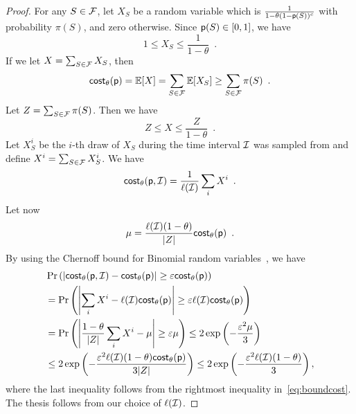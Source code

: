 \begin{proof}
	For any $S\in\mathcal{F}$, let $X_S$ be a random variable which is
	$\frac{1}{1-\theta(1-\mathsf{p}(S))^c}$ with probability $\pi(S)$, and zero
	otherwise. Since $\mathsf{p}(S)\in [0,1]$, we have
	\[
		1\leq X_S \leq \frac{1}{1-\theta}\enspace.
	\]
	If we let $X = \sum_{S\in \mathcal{F}} X_S$, then
	\begin{equation}\label{eq:boundcost}
		\mathsf{cost}_\theta(\mathsf{p}) = \mathbb{E}[X] = \sum_{S\in\mathcal{F}} \mathbb{E}[X_{S}]
		\geq \sum_{S\in\mathcal{F}}\pi(S)\enspace.
	\end{equation}
	Let $Z=\sum_{S\in\mathcal{F}}\pi(S)$. Then we have
	\[
		Z \leq X \leq \frac{Z}{1-\theta}\enspace.
	\]
	Let $X^i_S$ be the $i$-th draw of $X_S$ during the time interval $\mathcal{I}$
	was sampled from and define $X^i = \sum_{S\in\mathcal{F}}X_S^i$. We have
	\[
		\mathsf{cost}_\theta(\mathsf{p},\mathcal{I}) =
		\frac{1}{\ell(\mathcal{I})}\sum_{i}X^i\enspace.
	\]
	Let now
	\[
		\mu=\frac{\ell(\mathcal{I})(1-\theta)}{|Z|}\mathsf{cost}_\theta(\mathsf{p})\enspace.
	\]
	By using the Chernoff bound for Binomial random
	variables~\citep[Corol.~4.6]{MitzenmacherU05}, we have
	\begin{align*}
		&\Pr\left(\left|\mathsf{cost}_\theta(\mathsf{p},\mathcal{I}) - \mathsf{cost}_\theta(\mathsf{p})\right| \geq \varepsilon
		\mathsf{cost}_\theta(\mathsf{p})\right)\\
		&=\Pr\left(\left|\sum_i X^i - \ell(\mathcal{I})\mathsf{cost}_\theta(\mathsf{p})\right| \geq \varepsilon
		\ell(\mathcal{I}) \mathsf{cost}_\theta(\mathsf{p})\right) \\
		&= \Pr\left(\left|\frac{1-\theta}{|Z|}\sum_i X^i - \mu\right| \geq \varepsilon
		\mu\right) \leq 2\exp\left(-\frac{\varepsilon^2\mu}{3}\right)\\
		&\le 2\exp\left(-\frac{\varepsilon^2 \ell(\mathcal{I}) (1-\theta)
			\mathsf{cost}_\theta(\mathsf{p})}{3|Z|}\right) \leq 2\exp\left(-\frac{\varepsilon^2 \ell(\mathcal{I}) (1-\theta)}{3}\right),
	\end{align*}
	where the last inequality follows from the rightmost inequality
	in~\eqref{eq:boundcost}. The thesis follows from our choice of
	$\ell(\mathcal{I})$.
\end{proof}

